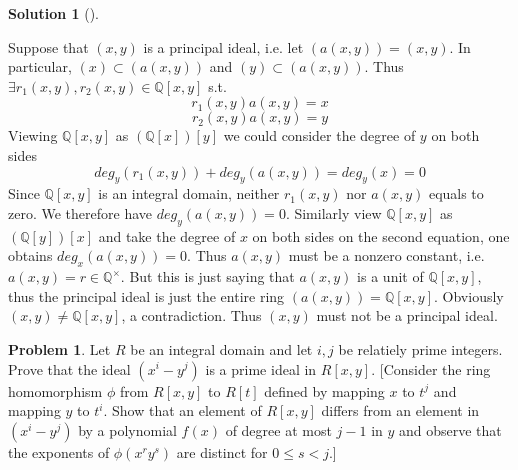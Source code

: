 \documentclass{article}
\theoremstyle{definition}
\newtheorem{prob}{Problem}
\newtheorem*{sol}{Solution}
\newenvironment{sols}[1][]{%
  \begin{sol}[#1]$ $\par\nobreak\ignorespaces
}{%
  \end{sol}
}
\begin{document}
\begin{sols}
  Suppose that $(x, y)$ is a principal ideal, i.e. let $(a(x, y)) = (x, y)$. In particular, $(x) \subset (a(x, y))$ and $(y) \subset (a(x, y))$. Thus $\exists r_1(x, y), r_2(x, y) \in \mathbb{Q}[x, y]$ s.t.
  \[
    r_1(x, y) a (x, y) = x
  \]
  \[
    r_2(x, y) a(x, y) = y
  \]
  Viewing $\mathbb{Q}[x, y]$ as $(\mathbb{Q}[x])[y]$ we could consider the degree of $y$ on both sides 
  \[
    deg_y(r_1(x, y)) + deg_y (a(x, y)) = deg_y(x) = 0
  \]
  Since $\mathbb{Q}[x, y]$ is an integral domain, neither $r_1(x, y)$ nor $a(x, y)$ equals to zero. We therefore have $deg_y(a(x, y)) = 0$. Similarly view $\mathbb{Q}[x, y]$ as $(\mathbb{Q}[y])[x]$ and take the degree of $x$ on both sides on the second equation, one obtains $deg_x(a(x, y)) = 0$. Thus $a(x, y)$ must be a nonzero constant, i.e. $a(x, y) = r \in \mathbb{Q}^\times$. But this is just saying that $a(x, y)$ is a unit of $\mathbb{Q}[x, y]$, thus the principal ideal is just the entire ring $(a(x, y)) = \mathbb{Q}[x, y]$. Obviously $(x, y) \neq \mathbb{Q}[x, y]$, a contradiction. Thus $(x, y)$ must not be a principal ideal. 
\end{sols}

\setcounter{prob}{13}
\begin{prob}
  Let $R$ be an integral domain and let $i, j$ be relatiely prime integers. Prove that the ideal $(x^i - y^j)$ is a prime ideal in $R[x, y]$. [Consider the ring homomorphism $\phi$ from $R[x, y]$ to $R[t]$ defined by mapping $x$ to $t^j$ and mapping $y$ to $t^i$. Show that an element of $R[x, y]$ differs from an element in $(x^i - y^j)$ by a polynomial $f(x)$ of degree at most $j - 1$ in $y$ and observe that the exponents of $\phi(x^r y^s)$ are distinct for $0 \leq s < j$.]
\end{prob}
\end{document}
